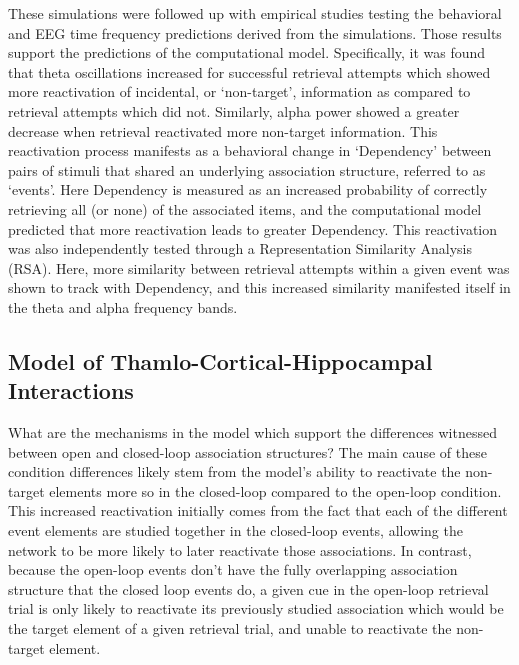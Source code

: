 \documentclass[11pt, titlepage, twoside]{article}
\begin{document}
These simulations were followed up with empirical studies testing the behavioral and EEG time frequency predictions derived from the simulations.  %
Those results support the predictions of the computational model.  Specifically, it was found that theta oscillations increased for successful retrieval attempts which showed more reactivation of incidental, or `non-target', information as compared to retrieval attempts which did not.  Similarly, alpha power showed a greater decrease when retrieval reactivated more non-target information.  This reactivation process manifests as a behavioral change in `Dependency' between pairs of stimuli that shared an underlying association structure, referred to as `events'.  Here Dependency is measured as an increased probability of correctly retrieving all (or none) of the associated items, and the computational model predicted that more reactivation leads to greater Dependency.  This reactivation was also independently tested through a Representation Similarity Analysis (RSA).  Here, more similarity between retrieval attempts within a given event was shown to track with Dependency, and this increased similarity manifested itself in the theta and alpha frequency bands.




\subsection{Model of Thamlo-Cortical-Hippocampal Interactions}

What are the mechanisms in the model which support the differences witnessed between open and closed-loop association structures? The main cause of these condition differences likely stem from the model's ability to reactivate the non-target elements more so in the closed-loop compared to the open-loop condition.  This increased reactivation initially comes from the fact that each of the different event elements are studied together in the closed-loop events, allowing the network to be more likely to later reactivate those associations.  In contrast, because the open-loop events don't have the fully overlapping association structure that the closed loop events do, a given cue in the open-loop retrieval trial is only likely to reactivate its previously studied association which would be the target element of a given retrieval trial, and unable to reactivate the non-target element.  
\end{document}
